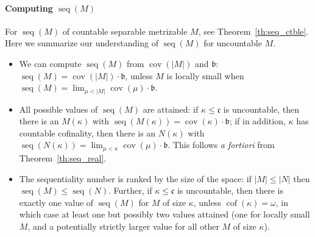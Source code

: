 \documentclass{article}
\DeclareMathOperator{\cof}{cof}
\begin{document}






 






  



\paragraph{Computing $\mathop{seq}(M)$}

For $\mathop{seq}(M)$ of countable separable metrizable $M$, see Theorem~\ref{th:seq_ctble}. Here we summarize our understanding of $\mathop{seq}(M)$ for uncountable $M$.
\begin{itemize}[topsep=2pt]
\item We can compute $\mathop{seq}(M)$ from $\mathop{cov}(|M|)$ and $\mathfrak{b}$: 
 $\mathop{seq}(M)=\mathop{cov}(|M|)\cdot\mathfrak{b}$, unless $M$ is locally small when  
$\mathop{seq}(M)=\lim_{\mu <|M|} \mathop{cov}(\mu)\cdot \mathfrak{b}$.  



\item All possible values of $\mathop{seq}(M)$ are attained: if $\kappa \le \mathfrak{c}$ is uncountable, then there is an $M(\kappa)$ with  $\mathop{seq}(M(\kappa))=\mathop{cov}(\kappa)\cdot \mathfrak{b}$; if in addition, $\kappa$ has countable cofinality, then there is an $N(\kappa)$ with $\mathop{seq}(N(\kappa))=\lim_{\mu <\kappa} \mathop{cov}(\mu)\cdot \mathfrak{b}$. This follows \textsl{a fortiori} from Theorem~\ref{th:seq_real}. 

\item The sequentiality number is ranked by the size of the space: if $|M| \le |N|$ then $\mathop{seq}(M) \le \mathop{seq}(N)$. Further, if $\kappa \le \mathfrak{c}$ is uncountable, then there is exactly one value of $\mathop{seq}(M)$ for $M$ of size $\kappa$, unless $\cof(\kappa)=\omega$, in which case at least one but possibly two values attained (one for locally small $M$, and a potentially strictly larger value for all other $M$ of size $\kappa$).   
\end{itemize}
\end{document}
